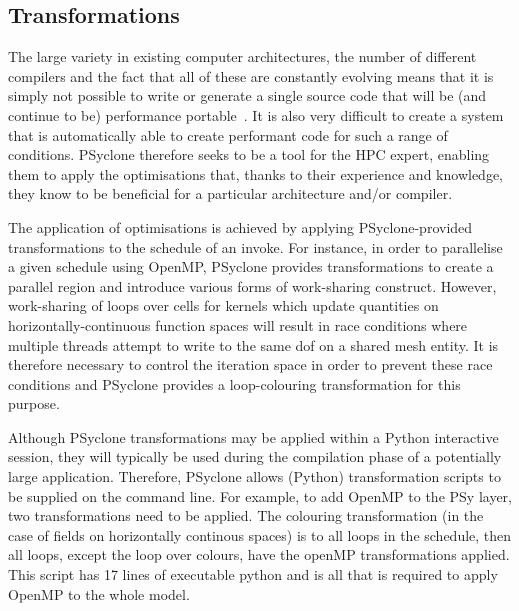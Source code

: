 \documentclass[review,times]{elsarticle}
\begin{document}
\subsection{Transformations}

The large variety in existing computer architectures, the number of
different compilers and the fact that all of these are constantly
evolving means that it is simply not possible to write or generate a
single source code that will be (and continue to be) performance
portable~\cite{shallow_psykal, nemolite2d_psykal}.  It is also very
difficult to create a system that is automatically able to create
performant code for such a range of conditions. PSyclone therefore
seeks to be a tool for the HPC expert, enabling them to apply the
optimisations that, thanks to their experience and knowledge, they
know to be beneficial for a particular architecture and/or compiler.

The application of optimisations is achieved by applying
PSyclone-provided transformations to the schedule of an invoke.  For
instance, in order to parallelise a given schedule using OpenMP,
PSyclone provides transformations to create a parallel region and
introduce various forms of work-sharing construct. However,
work-sharing of loops over cells for kernels which update quantities
on horizontally-continuous function spaces will result in race
conditions where multiple threads attempt to write to the same dof on
a shared mesh entity. It
is therefore necessary to control the iteration space in order to
prevent these race conditions and PSyclone provides a loop-colouring
transformation for this purpose.

Although PSyclone transformations may be applied within a Python
interactive session, they will typically be used during the
compilation phase of a potentially large application. Therefore,
PSyclone allows (Python) transformation scripts to be supplied
on the command line. For example, to add OpenMP to the PSy layer,
two transformations need to be applied. The colouring transformation
(in the case of fields on horizontally continous spaces) is to all
loops in the schedule, then all loops, except the loop over colours,
have the openMP transformations applied. This script has 17 lines of
executable python and is all that is required to apply OpenMP to the
whole model. 
\end{document}
